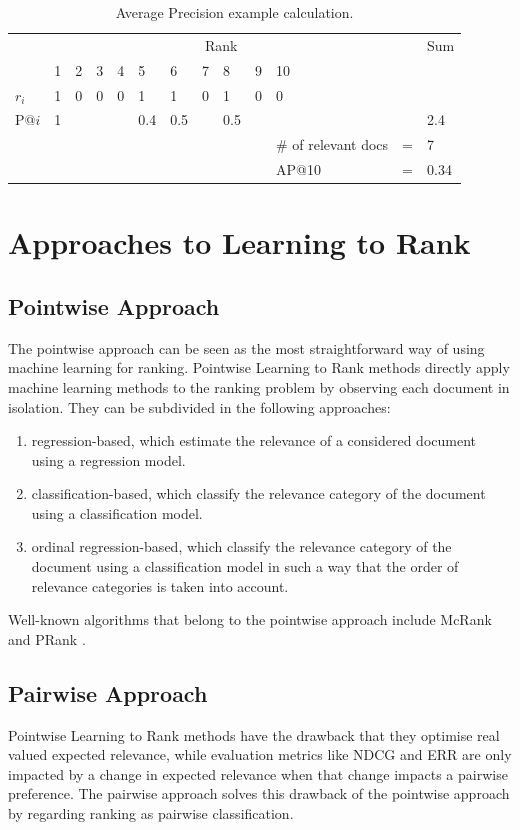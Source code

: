 \begin{table}
\begin{tabular}{lllllllllllll}
 & \multicolumn{10}{c}{Rank} &  & Sum \\ 
\cline{2-11}
 & 1 & 2 & 3 & 4 & 5 & 6 & 7 & 8 & 9 & 10 &  &  \\ 
\hline
$r_i$ & 1 & 0 & 0 & 0 & 1 & 1 & 0 & 1 & 0 & 0 &  &  \\ 
P@$i$ & 1 &  &  &  & 0.4 & 0.5 &  & 0.5 &  &  &  & 2.4 \\ 
\hline
 &  &  &  &  &  &  &  &  &  & \# of relevant docs & = & 7 \\ 
 &  &  &  &  &  &  &  &  &  & AP@10 & = & 0.34 \\ 
\end{tabular}
\caption{Average Precision example calculation.}
\label{tab:example_calculation_AP}
\end{table}

\section{Approaches to Learning to Rank}
\label{sec:ltr_approaches}
\subsection{Pointwise Approach}
The pointwise approach can be seen as the most straightforward way of using machine learning for ranking. Pointwise Learning to Rank methods directly apply machine learning methods to the ranking problem by observing each document in isolation. They can be subdivided in the following approaches:
	\begin{enumerate}
	\item regression-based, which estimate the relevance of a considered document using a regression model.
	\item classification-based, which classify the relevance category of the document using a classification model.
	\item ordinal regression-based, which classify the relevance category of the document using a classification model in such a way that the order of relevance categories is taken into account. 
	\end{enumerate}
Well-known algorithms that belong to the pointwise approach include McRank \cite{Li2007} and PRank \cite{Crammer2001}.
\subsection{Pairwise Approach}
Pointwise Learning to Rank methods have the drawback that they optimise real valued expected relevance, while evaluation metrics like \ac{NDCG} and \ac{ERR} are only impacted by a change in expected relevance when that change impacts a pairwise preference. The pairwise approach solves this drawback of the pointwise approach by regarding ranking as pairwise classification.\\

